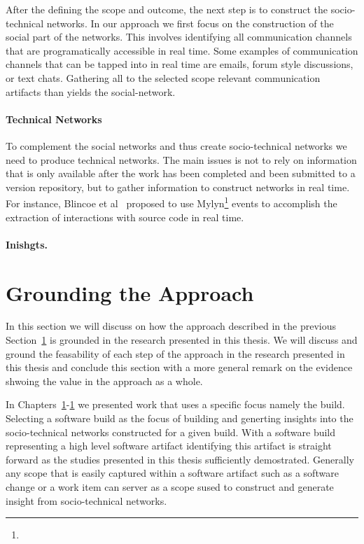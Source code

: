 After the defining the scope and outcome, the next step is to construct the socio-technical networks.
In our approach we first focus on the construction of the social part of the networks.
This involves identifying all communication channels that are programatically accessible in real time.
Some examples of communication channels that can be tapped into in real time are emails, forum style discussions, or text chats.
Gathering all to the selected scope relevant communication artifacts than yields the social-network.

\paragraph{Technical Networks}
To complement the social networks and thus create socio-technical networks we need to produce technical networks.
The main issues is not to rely on information that is only available after the work has been completed and been submitted to a version repository, but to gather information to construct networks in real time.
For instance, Blincoe et al~\cite{} proposed to use Mylyn\footnote{} events to accomplish the extraction of interactions with source code in real time.

\paragraph{Inishgts.}


\section{Grounding the Approach}
In this section we will discuss on how the approach described in the previous Section~\ref{} is grounded in the research presented in this thesis.
We will discuss and ground the feasability of each step of the approach in the research presented in this thesis and conclude this section with a more general remark on the evidence shwoing the value in the approach as a whole.

In Chapters~\ref{}-\ref{} we presented work that uses a specific focus namely the build.
Selecting a software build as the focus of building and generting insights into the socio-technical networks constructed for a given build.
With a software build representing a high level software artifact identifying this artifact is straight forward as the studies presented in this thesis sufficiently demostrated.
Generally any scope that is easily captured within a software artifact such as a software change or a work item can server as a scope sused to construct and generate insight from socio-technical networks.

